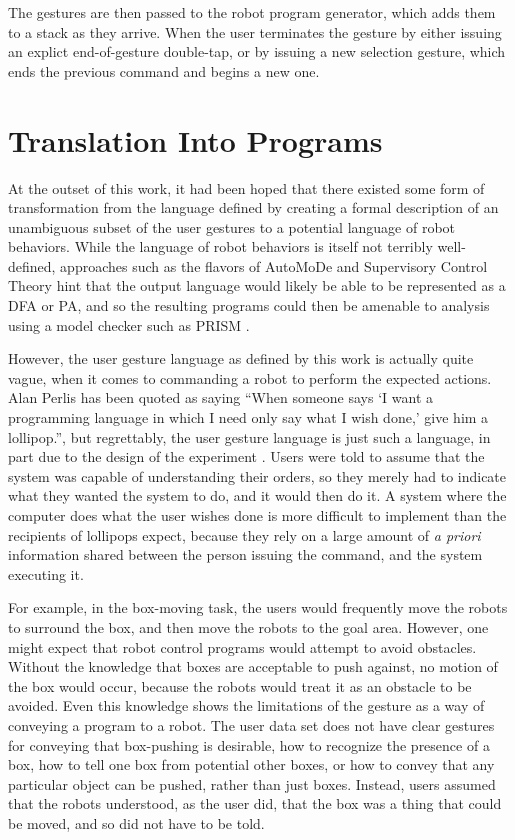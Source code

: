 The gestures are then passed to the robot program generator, which adds them to a stack as they arrive. 
When the user terminates the gesture by either issuing an explict end-of-gesture double-tap, or by issuing a new selection gesture, which ends the previous command and begins a new one. 

\section{Translation Into Programs}
At the outset of this work, it had been hoped that there existed some form of transformation from the language defined by creating a formal description of an unambiguous subset of the user gestures to a potential language of robot behaviors. 
While the language of robot behaviors is itself not terribly well-defined, approaches such as the flavors of AutoMoDe and Supervisory Control Theory hint that the output language would likely be able to be represented as a DFA or PA, and so the resulting programs could then be amenable to analysis using a model checker such as PRISM \citep{KNP11}.

However, the user gesture language as defined by this work is actually quite vague, when it comes to commanding a robot to perform the expected actions. 
Alan Perlis has been quoted as saying ``When someone says `I want a programming language in which I need only say what I wish done,' give him a lollipop.'', but regrettably, the user gesture language is just such a language, in part due to the design of the experiment \citep{PerlisYaleLolz}.  
Users were told to assume that the system was capable of understanding their orders, so they merely had to indicate what they wanted the system to do, and it would then do it. 
A system where the computer does what the user wishes done is more difficult to implement than the recipients of lollipops expect, because they rely on a large amount of \emph{a priori} information shared between the person issuing the command, and the system executing it. 

For example, in the box-moving task, the users would frequently move the robots to surround the box, and then move the robots to the goal area. 
However, one might expect that robot control programs would attempt to avoid obstacles.
Without the knowledge that boxes are acceptable to push against, no motion of the box would occur, because the robots would treat it as an obstacle to be avoided. 
Even this knowledge shows the limitations of the gesture as a way of conveying a program to a robot.
The user data set does not have clear gestures for conveying that box-pushing is desirable, how to recognize the presence of a box, how to tell one box from potential other boxes, or how to convey that any particular object can be pushed, rather than just boxes. 
Instead, users assumed that the robots understood, as the user did, that the box was a thing that could be moved, and so did not have to be told.

